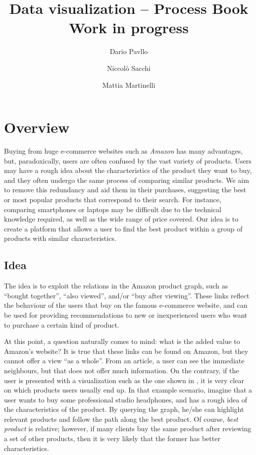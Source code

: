 \documentclass[a4paper,12pt]{article}
\title{Data visualization -- Process Book\\\textbf{Work in progress}}
\author{Dario Pavllo \and Niccolò Sacchi \and Mattia Martinelli}
\date{} %
\begin{document}
\maketitle
\section{Overview}
Buying from huge e-commerce websites such as \emph{Amazon} has many advantages, but, paradoxically, users are often confused by the vast variety of products. Users may have a rough idea about the characteristics of the product they want to buy, and they often undergo the same process of comparing similar products. We aim to remove this redundancy and aid them in their purchases, suggesting the best or most popular products that correspond to their search. For instance, comparing smartphones or laptops may be difficult due to the technical knowledge required, as well as the wide range of price covered. Our idea is to create a platform that allows a user to find the best product within a group of products with similar characteristics.

\subsection{Idea}
The idea is to exploit the relations in the Amazon product graph, such as ``bought together'', ``also viewed'', and/or ``buy after viewing''. These links reflect the behaviour of the users that buy on the famous e-commerce website, and can be used for providing recommendations to new or inexperienced users who want to purchase a certain kind of product.

At this point, a question naturally comes to mind: what is the added value to Amazon's website? It is true that these links can be found on Amazon, but they cannot offer a view ``as a whole''. From an article, a user can see the immediate neighbours, but that does not offer much information. On the contrary, if the user is presented with a visualization such as the one shown in , it is very clear on which products users usually end up. In that example scenario, imagine that a user wants to buy some professional studio headphones, and has a rough idea of the characteristics of the product. By querying the graph, he/she can highlight relevant products and follow the path along the best product. Of course, \emph{best product} is relative; however, if many clients buy the same product after reviewing a set of other products, then it is very likely that the former has better characteristics.
\end{document}
